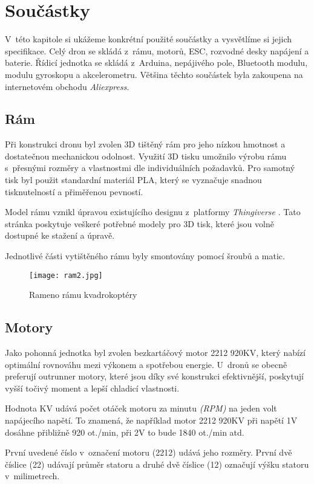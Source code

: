 \documentclass[12pt]{report}
\begin{document}
\chapter[Součástky]{Součástky}
V~této kapitole si ukážeme konkrétní použité součástky a vysvětlíme si jejich specifikace. Celý dron se skládá z~rámu, motorů, ESC, rozvodné desky napájení a baterie. Řídicí jednotka se skládá z~Arduina, nepájivého pole, Bluetooth modulu, modulu gyroskopu a akcelerometru. Většina těchto součástek byla zakoupena na internetovém obchodu \textit{Aliexpress}.

\section[Rám]{Rám}
Při konstrukci dronu byl zvolen 3D tištěný rám pro jeho nízkou hmotnost a dostatečnou mechanickou odolnost. Využití 3D tisku umožnilo výrobu rámu s~přesnými rozměry a vlastnostmi dle individuálních požadavků. Pro samotný tisk byl použit standardní materiál PLA, který se vyznačuje snadnou tisknutelností a přiměřenou pevností.

Model rámu vznikl úpravou existujícího designu z~platformy \textit{Thingiverse} \cite{ram}. Tato stránka poskytuje veškeré potřebné modely pro 3D tisk, které jsou volně dostupné ke stažení a úpravě.

Jednotlivé části vytištěného rámu byly smontovány pomocí šroubů a matic.

\begin{figure}[H]
	\centering
	\texttt{[image: ram2.jpg]}
	\caption{Rameno rámu kvadrokoptéry}
	\label{fig:ram2.jpg}
\end{figure}

\section[Motory]{Motory}
Jako pohonná jednotka byl zvolen bezkartáčový motor 2212 920KV, který nabízí optimální rovnováhu mezi výkonem a spotřebou energie. U~dronů se obecně preferují outrunner motory, které jsou díky své konstrukci efektivnější, poskytují vyšší točivý moment a lepší chladicí vlastnosti.

Hodnota KV udává počet otáček motoru za minutu \textit{(RPM)} na jeden volt napájecího napětí. To znamená, že například motor 2212 920KV při napětí 1V dosáhne přibližně 920 ot./min, při 2V to bude 1840 ot./min atd.

První uvedené číslo v~označení motoru (2212) udává jeho rozměry. První dvě číslice (22) udávají průměr statoru a druhé dvě číslice (12) označují výšku statoru v~milimetrech.
\end{document}
